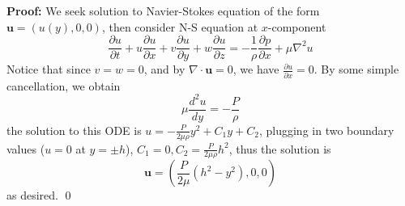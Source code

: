 \documentclass[12pt]{article}
\begin{document}
\textbf{Proof:} We seek solution to Navier-Stokes equation of the form $\textbf{u}=(u(y), 0, 0)$, then consider N-S equation at $x$-component
$$
    \frac{\partial u}{\partial t}+u\frac{\partial u}{\partial x}+v\frac{\partial u}{\partial y}+w\frac{\partial u}{\partial z}=-\frac{1}{\rho}\frac{\partial p}{\partial x}+\mu\nabla^2u
$$
Notice that since $v=w=0$, and by $\nabla\cdot \textbf{u}=0$, we have $\frac{\partial u}{\partial x}=0$. By some simple cancellation, we obtain
$$
    \mu\frac{d^2u}{dy}=-\frac{P}{\rho}
$$
the solution to this ODE is $u=-\frac{P}{2\mu\rho}y^2+C_1y+C_2$, plugging in two boundary values ($u=0$ at $y=\pm h$), $C_1=0, C_2=\frac{P}{2\mu\rho}h^2$, thus the solution is 
$$
    \textbf{u}=\left(\frac{P}{2\mu}(h^2-y^2),0,0\right)
$$
as desired. \qed
\end{document}
